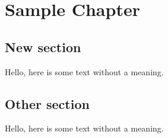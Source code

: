 \chapter{Sample Chapter}
\section{New section}
Hello, here is some text without a meaning.

\section{Other section}
Hello, here is some text without a meaning.
